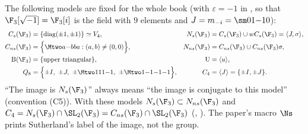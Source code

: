 \begin{convention}\label{conv:groups:models}
The following models are fixed for the whole book (with $\varepsilon=-1$ in , so that $\F_3[\sqrt{-1}]=\F_3[i]$ is the field with $9$ elements and
$J=m_{-i}=\sm01{-1}0$):
\begin{align*}
C_s(\F_3)&=\{\mathrm{diag}(\pm1,\pm1)\}\simeq V_4, & N_s(\F_3)&=C_s(\F_3)\cup wC_s(\F_3)=\langle J,\sigma\rangle,\\
C_{ns}(\F_3)&=\Bigl\{\Mtwo a{-b}ba:(a,b)\ne(0,0)\Bigr\}, & N_{ns}(\F_3)&=C_{ns}(\F_3)\cup C_{ns}(\F_3)\sigma,\\
\mathrm B(\F_3)&=\{\text{upper triangular}\}, & \mathrm U&=\langle u\rangle,\\
Q_8&=\Bigl\{\pm I,\ \pm J,\ \pm\Mtwo111{-1},\ \pm\Mtwo1{-1}{-1}{-1}\Bigr\}, & C_4&=\langle J\rangle=\{\pm I,\pm J\}.
\end{align*}
``The image is $N_s(\F_3)$'' always means ``the image is conjugate to this model'' (convention (C5)). With these models $N_s(\F_3)\subset N_{ns}(\F_3)$ and
$C_4=N_s(\F_3)\cap\SL_2(\F_3)=C_{ns}(\F_3)\cap\SL_2(\F_3)$ (, ). The paper's macro $\Ns$ prints Sutherland's label of the
image, not the group.
\end{convention}


